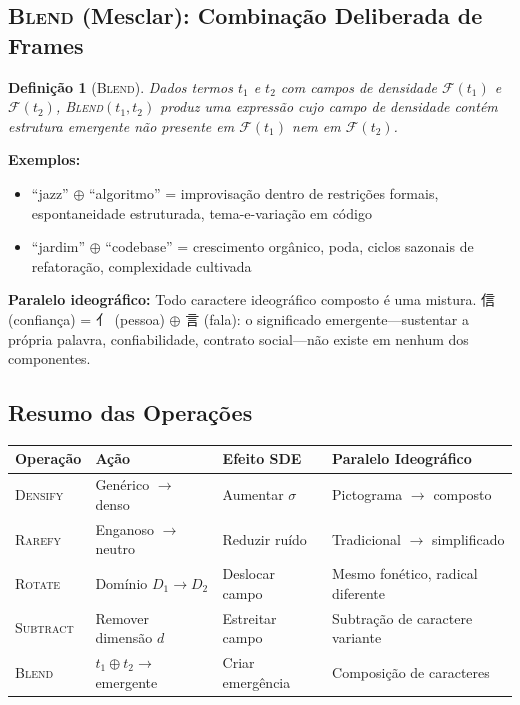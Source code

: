 \documentclass[12pt,a4paper]{article}
\newcommand{\cjk}[1]{{\cjkfont #1}}
\newtheorem{definition}{Definição}[section]
\begin{document}
\subsection{\textsc{Blend} (Mesclar): Combinação Deliberada de Frames}
\label{subsec:blend}

\begin{definition}[\textsc{Blend}]
Dados termos $t_1$ e $t_2$ com campos de densidade $\mathcal{F}(t_1)$ e $\mathcal{F}(t_2)$, \textsc{Blend}$(t_1, t_2)$ produz uma expressão cujo campo de densidade contém estrutura emergente não presente em $\mathcal{F}(t_1)$ nem em $\mathcal{F}(t_2)$.
\end{definition}

\textbf{Exemplos:}
\begin{itemize}
  \item ``jazz'' $\oplus$ ``algoritmo'' = improvisação dentro de restrições formais, espontaneidade estruturada, tema-e-variação em código
  \item ``jardim'' $\oplus$ ``codebase'' = crescimento orgânico, poda, ciclos sazonais de refatoração, complexidade cultivada
\end{itemize}

\textbf{Paralelo ideográfico:}
Todo caractere ideográfico composto é uma mistura.
\cjk{信} (confiança) = \cjk{亻} (pessoa) $\oplus$ \cjk{言} (fala): o significado emergente---sustentar a própria palavra, confiabilidade, contrato social---não existe em nenhum dos componentes.

\subsection{Resumo das Operações}

\begin{center}
\begin{tabular}{llll}
\toprule
\textbf{Operação} & \textbf{Ação} & \textbf{Efeito SDE} & \textbf{Paralelo Ideográfico} \\
\midrule
\textsc{Densify}  & Genérico $\rightarrow$ denso & Aumentar $\sigma$ & Pictograma $\rightarrow$ composto \\
\textsc{Rarefy}   & Enganoso $\rightarrow$ neutro & Reduzir ruído & Tradicional $\rightarrow$ simplificado \\
\textsc{Rotate}   & Domínio $D_1 \rightarrow D_2$ & Deslocar campo & Mesmo fonético, radical diferente \\
\textsc{Subtract} & Remover dimensão $d$ & Estreitar campo & Subtração de caractere variante \\
\textsc{Blend}    & $t_1 \oplus t_2 \rightarrow$ emergente & Criar emergência & Composição de caracteres \\
\bottomrule
\end{tabular}
\end{center}
\end{document}
